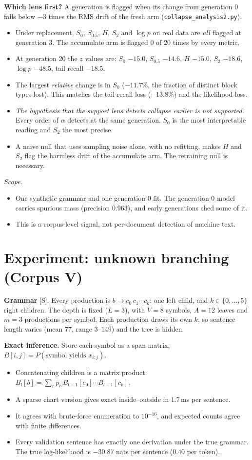 \documentclass[11pt]{article}
\theoremstyle{definition}
\theoremstyle{remark}
\newcommand{\src}[1]{\textsf{\small[#1]}}
\begin{document}
\textbf{Which lens first?} A generation is flagged when its change from generation 0 falls below $-3$ times the RMS drift of the fresh arm (\texttt{collapse\_analysis2.py}).
\begin{itemize}
  \item Under replacement, $S_0$, $S_{0.5}$, $H$, $S_2$ and $\log p$ on real data are \emph{all} flagged at generation 3. The accumulate arm is flagged 0 of 20 times by every metric.
  \item At generation 20 the $z$ values are: $S_0$ $-15.0$, $S_{0.5}$ $-14.6$, $H$ $-15.0$, $S_2$ $-18.6$, $\log p$ $-48.5$, tail recall $-18.5$.
  \item The largest \emph{relative} change is in $S_0$ ($-11.7\%$, the fraction of distinct block types lost). This matches the tail-recall loss ($-13.8\%$) and the likelihood loss.
  \item \emph{The hypothesis that the support lens detects collapse earlier is not supported.} Every order of $\alpha$ detects at the same generation. $S_0$ is the most interpretable reading and $S_2$ the most precise.
  \item A naive null that uses sampling noise alone, with no refitting, makes $H$ and $S_2$ flag the harmless drift of the accumulate arm. The retraining null is necessary.
\end{itemize}
\emph{Scope.}
\begin{itemize}
  \item One synthetic grammar and one generation-0 fit. The generation-0 model carries spurious mass (precision $0.963$), and early generations shed some of it.
  \item This is a corpus-level signal, not per-document detection of machine text.
\end{itemize}

\section{Experiment: unknown branching (Corpus V)}\label{sec:vbranch}
\textbf{Grammar} \src{S}. Every production is $b\to c_0\,c_1\cdots c_k$: one left child, and $k\in\{0,\dots,5\}$ right children. The depth is fixed ($L=3$), with $V=8$ symbols, $A=12$ leaves and $m=3$ productions per symbol. Each production draws its own $k$, so sentence length varies (mean $77$, range $3$--$149$) and the tree is hidden.

\textbf{Exact inference.} Store each symbol as a span matrix, $B[i,j]=P(\text{symbol yields }x_{i:j})$.
\begin{itemize}
  \item Concatenating children is a matrix product: $B_l[b]=\sum_rp_r\,B_{l-1}[c_0]\cdots B_{l-1}[c_k]$.
  \item A sparse chart version gives exact inside--outside in $1.7$\,ms per sentence.
  \item It agrees with brute-force enumeration to $10^{-16}$, and expected counts agree with finite differences.
  \item Every validation sentence has exactly one derivation under the true grammar. The true log-likelihood is $-30.87$ nats per sentence ($0.40$ per token).
\end{itemize}
\end{document}

